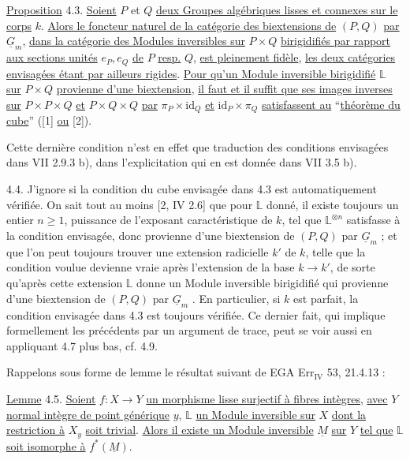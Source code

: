 \underline{Proposition} 4.3. \underline{Soient} $P$ et $Q$ \underline{deux Groupes algébriques lisses et connexes sur le corps} $k$. \underline{Alors le foncteur naturel de la catégorie des biextensions de} $(P,Q)$ \underline{par} $\underline{G}_m$, \underline{dans la catégorie des Modules inversibles sur} $P \times Q$ \underline{birigidifiés par rapport aux sections unités} $e_P,e_Q$ \underline{de} $P$ \underline{resp.} $Q$,
\underline{est pleinement fidèle}, \underline{les deux catégories envisagées étant par ailleurs rigides}. \underline{Pour qu'un Module inversible birigidifié} $\mathbb{L}$ \underline{sur} $P \times Q$ \underline{provienne d'une biextension}, \underline{il faut et il suffit que ses images inverses sur} $P \times P \times Q$ \underline{et} $P \times Q \times Q$ \underline{par} $\pi_P \times \mathrm{id}_Q$ \underline{et} $\mathrm{id}_P \times \pi_Q$ \underline{satisfassent au} ``\underline{théorème du cube}'' ([1] \underline{ou} [2]).

Cette dernière condition n'est en effet que traduction des conditions envisagées dans VII 2.9.3 b), dans l'explicitation qui en est donnée dans VII 3.5 b).

4.4. J'ignore si la condition du cube envisagée dans 4.3 est automatiquement vérifiée. On sait tout au moins [2, IV 2.6] que pour $\mathbb{L}$ donné, il existe toujours un entier $n \geqslant 1$, puissance de l'exposant caractéristique de $k$, tel que $\mathbb{L}^{\otimes n}$ satisfasse à la condition envisagée, donc provienne d'une biextension de $(P,Q)$ par $\underline{G}_m$ ; et que l'on peut toujours trouver une extension radicielle $k'$ de $k$, telle que la condition voulue devienne vraie après l'extension de la base $k \longrightarrow k'$, de sorte qu'après cette extension $\mathbb{L}$ donne un Module inversible birigidifié qui provienne d'une biextension de $(P,Q)$ par $\underline{G}_m$ . En particulier, si $k$ est parfait, la condition envisagée dans 4.3 est toujours vérifiée. Ce dernier fait, qui implique formellement les précédents par un argument de trace, peut se voir aussi en appliquant 4.7 plus bas, cf. 4.9.

Rappelons sous forme de lemme le résultat suivant de EGA Err$_{\mathrm{IV}}$ 53, 21.4.13 :


\underline{Lemme} 4.5. \underline{Soient} $f : X \longrightarrow Y$ \underline{un morphisme lisse surjectif à fibres intègres}, \underline{avec} $Y$ \underline{normal intègre de point générique} $y$, $\mathbb{L}$ \underline{un Module inversible sur} $X$ \underline{dont la restriction à} $X_y$ \underline{soit trivial}. \underline{Alors il existe un Module inversible} $\underline{M}$ \underline{sur} $Y$ \underline{tel que} $\mathbb{L}$ \underline{soit isomorphe à} $f^*(\underline{M})$.

